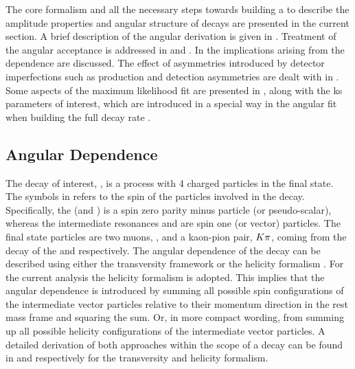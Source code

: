 
The core formalism and all the necessary steps towards building a \pdf to describe the amplitude properties and angular structure of \BJpsiKst decays are presented in
the current section. A brief description of the angular \pdf derivation is given in .
Treatment of the angular acceptance is addressed in  and .
In  the implications arising from the \mkpi dependence are discussed.
The effect of asymmetries introduced by detector imperfections such as production and detection asymmetries are dealt with
in . Some aspects of the maximum likelihood fit are presented in ,
along with the \Acp{k} parameters of interest, which are introduced in a special way in the angular fit when building the full decay rate \pdf.


\subsection{Angular Dependence}
\label{Diferential_Decay_Rate}

The decay of interest, \BsJpsiKst, is a \PtoVV process with 4 charged particles in the final state.
The symbols in \PtoVV refers to the spin of the particles involved in the decay.
Specifically, the \Bs (and \Bd) is a spin zero parity minus particle (or pseudo-scalar), whereas the intermediate resonances
\jpsi and \Kstarzb are spin one (or vector) particles. The final state particles are
two muons, \mmu, and a kaon-pion pair, $K\pi$, coming from the decay of the \jpsi and \Kstarzb respectively.
The angular dependence of the \BsJpsiKst decay can be described using either the transversity framework \cite{transvFrameworkI,transvFrameworkII}
or the helicity formalism \cite{helicityFormI,helicityFormII}. For the current analysis the helicity
formalism is adopted. This implies that the angular dependence is introduced by summing all possible
spin configurations of the intermediate vector particles relative to their momentum direction in the
\Bs rest mass frame and squaring the sum. Or, in more compact wording, from summing up all possible
helicity configurations of the intermediate vector particles. A detailed derivation of both approaches
within the scope of a \PtoVV decay can be found in \cite{daanThesis} and \cite{jeroenThesis} respectively
for the transversity and helicity formalism.

